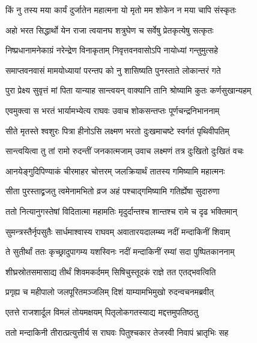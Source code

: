 \twolineshloka
{किं नु तस्य मया कार्यं दुर्जातेन महात्मना}
{यो मृतो मम शोकेन न मया चापि संस्कृतः} %

\twolineshloka
{अहो भरत सिद्धार्थो येन राजा त्वयानघ}
{शत्रुघेण च सर्वेषु प्रेतकृत्येषु सत्कृतः} %

\twolineshloka
{निष्प्रधानामनेकाग्रं नरेन्द्रेण विनाकृताम्}
{निवृत्तवनवासोऽपि नायोध्यां गन्तुमुत्सहे} %

\twolineshloka
{समाप्तवनवासं मामयोध्यायां परन्तप}
{को नु शासिष्यति पुनस्ताते लोकान्तरं गते} %

\twolineshloka
{पुरा प्रेक्ष्य सुवृत्तं मां पिता यान्याह सान्त्वयन्}
{वाक्यानि तानि श्रोष्यामि कुतः कर्णसुखान्यहम्} %

\twolineshloka
{एवमुक्त्वा स भरतं भार्यामभ्येत्य राघवः}
{उवाच शोकसन्तप्तः पूर्णचन्द्रनिभाननाम्} %

\twolineshloka
{सीते मृतस्ते श्वशुरः पित्रा हीनोऽसि लक्ष्मण}
{भरतो दुःखमाचष्टे स्वर्गतं पृथिवीपतिम्} %

\twolineshloka
{सान्त्वयित्वा तु तां रामो रुदन्तीं जनकात्मजाम्}
{उवाच लक्ष्मणं तत्र दुःखितो दुःखितं वचः} %

\twolineshloka
{आनयेङ्गुदिपिण्याकं चीरमाहर चोत्तरम्}
{जलक्रियार्थं तातस्य गमिष्यामि महात्मनः} %

\twolineshloka
{सीता पुरस्ताद्व्रजतु त्वमेनामभितो व्रज}
{अहं पश्चाद्गमिष्यामि गतिर्ह्येषा सुदारुणा} %

\twolineshloka
{ततो नित्यानुगस्तेषां विदितात्मा महामतिः}
{मृदुर्दान्तश्च शान्तश्च रामे च दृढ भक्तिमान्} %

\twolineshloka
{सुमन्त्रस्तैर्नृपसुतैः सार्धमाश्वास्य राघवम्}
{अवातारयदालम्ब्य नदीं मन्दाकिनीं शिवाम्} %

\twolineshloka
{ते सुतीर्थां ततः कृच्छ्रादुपागम्य यशस्विनः}
{नदीं मन्दाकिनीं रम्यां सदा पुष्पितकाननाम्} %

\twolineshloka
{शीघ्रस्रोतसमासाद्य तीर्थं शिवमकर्दमम्}
{सिषिचुस्तूदकं राज्ञे तत एतद्भवत्विति} %

\twolineshloka
{प्रगृह्य च महीपालो जलपूरितमञ्जलिम्}
{दिशं याम्यामभिमुखो रुदन्वचनमब्रवीत्} %

\twolineshloka
{एतत्ते राजशार्दूल विमलं तोयमक्षयम्}
{पितृलोकगतस्याद्य मद्दत्तमुपतिष्ठतु} %

\twolineshloka
{ततो मन्दाकिनी तीरात्प्रत्युत्तीर्य स राघवः}
{पितुश्चकार तेजस्वी निवापं भ्रातृभिः सह} %

